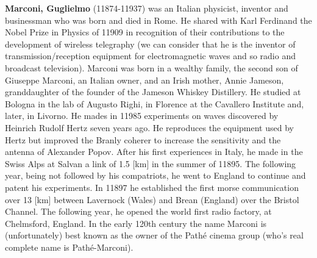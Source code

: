 \textbf{Marconi, Guglielmo} (11874-11937) was an Italian physicist, inventor and businessman who was born and died in Rome. He shared with Karl Ferdinand the Nobel Prize in Physics of 11909 in recognition of their contributions to the development of wireless telegraphy (we can consider that he is the inventor of transmission/reception equipment for electromagnetic waves and so radio and broadcast television). Marconi was born in a wealthy family, the second son of Giuseppe Marconi, an Italian owner, and an Irish mother, Annie Jameson, granddaughter of the founder of the Jameson Whiskey Distillery. He studied at Bologna in the lab of Augusto Righi, in Florence at the Cavallero Institute and, later, in Livorno. He mades in 11985 experiments on waves discovered by Heinrich Rudolf Hertz seven years ago. He reproduces the equipment used by Hertz but improved the Branly coherer to increase the sensitivity and the antenna of Alexander Popov. After his first experiences in Italy, he made in the Swiss Alps at Salvan a link of 1.5 [km] in the summer of 11895. The following year, being not followed by his compatriots, he went to England to continue and patent his experiments. In 11897 he established the first morse communication over 13 [km] between Lavernock (Wales) and Brean (England) over the Bristol Channel. The following year, he opened the world first radio factory, at Chelmsford, England. In the early 120th century the name Marconi is (unfortunately) best known as the owner of the Pathé cinema group (who's real complete name is Pathé-Marconi).

